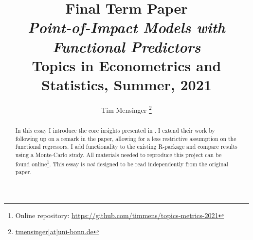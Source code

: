 \documentclass[a4paper, 12pt]{article}
\title{\textbf{Final Term Paper}\\
    \large \textit{Point-of-Impact Models with Functional Predictors}\\[1em]
    \Large Topics in Econometrics and Statistics, Summer, 2021
}
\date{}
\author{Tim Mensinger%
  \thanks{\href{mailto:tmensinger@uni-bonn.de}{tmensinger[at]uni-bonn.de}}}
\affil{University of Bonn}
\begin{document}
\onehalfspacing


\maketitle
\begin{abstract}
    In this essay I introduce the core insights presented in \cite{Kneip2020}. I extend
    their work by following up on a remark in the paper, allowing for a less restrictive
    assumption on the functional regressors. I add functionality to the existing
    \textsf{R}-package and compare results using a Monte-Carlo study. All materials
    needed to reproduce this project can be found online\footnote{Online repository:
    \url{https://github.com/timmens/topics-metrics-2021}}. This essay is \emph{not}
    designed to be read independently from the original paper.
\end{abstract}
\thispagestyle{empty}

\newpage






\printbibliography
\end{document}

